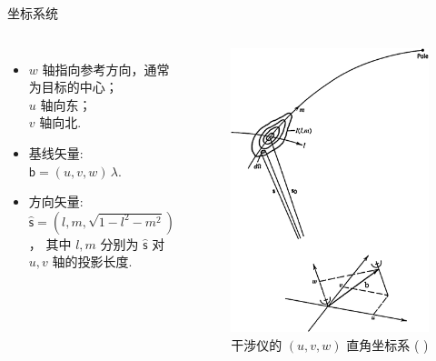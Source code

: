 \documentclass{beamer}
\newcommand{\B}[1]{\bm{\mathsf{#1}}}  %
\newcommand{\citeay}[1]{\citeauthor{#1} \citeyear{#1} \parencite{#1}}
\begin{document}
\begin{frame}{坐标系统}
  \begin{columns}
    \begin{itemize}
      \item $w$ 轴指向参考方向，通常为目标的中心； \\
        $u$ 轴向东； \\
        $v$ 轴向北.
      \item 基线矢量: $\B{b} = (u,v,w) \,\lambda$.
      \item 方向矢量: $\hat{\B{s}} = \left( l, m, \sqrt{1-l^2-m^2} \right)$，
        其中 $l, m$ 分别为 $\hat{\B{s}}$ 对 $u, v$ 轴的投影长度.
    \end{itemize}

    \begin{figure}
      \centering
      \includegraphics[width=\columnwidth]{interferometer-coordsys}
      \caption{干涉仪的 $(u,v,w)$ 直角坐标系 (\citeay{thompson2017})}
    \end{figure}
  \end{columns}
\end{frame}
\end{document}
